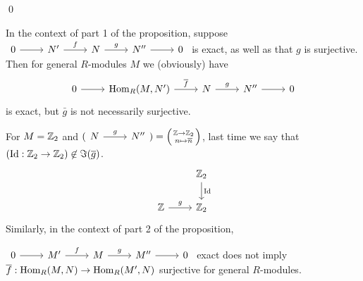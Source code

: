\documentclass[x11names,reqno,14pt]{extarticle}
\begin{document}
\qed

\rem In the context of part 1 of the proposition, suppose $\exactshort{N'}{f}{N}{g}{N''}$ is exact, as well as that $g$ is surjective. Then for general $R$-modules $M$ we (obviously) have
\[
\begin{tikzcd}
0\ar[r]&\Hom_R(M, N')\ar[r, "\bar{f}"] & N\ar[r, "g"] & N''\ar[r] & 0 
\end{tikzcd}
\]
is exact, but $\bar{g}$ is not necessarily surjective.

\exm

For $M = \mathbb{Z}_2$ and $(\begin{tikzcd}N\ar[r, "g"]&N''\end{tikzcd}) = \left({{\Z\to\Z_2}\atop{n\mapsto\bar{n}}}\right)$, last time we say that $(\operatorname{\mathrm{Id}}:\mathbb{Z}_2\to\mathbb{Z}_2)\not\in\Im(\overline{g})$. 
\[
\begin{tikzcd}
&\Z_2\ar[d, "\Id"] \\
\Z\ar[r, "g"]&\Z_2
\end{tikzcd}
\]
Similarly, in the context of part 2 of the proposition, 

$\exactshort{M'}{f}{M}{g}{M''}$ exact does not imply $\overline{f}:{\mathrm{Hom}}_R(M, N)\to{\mathrm{Hom}}_R(M', N)$ surjective for general $R$-modules. 
\end{document}

